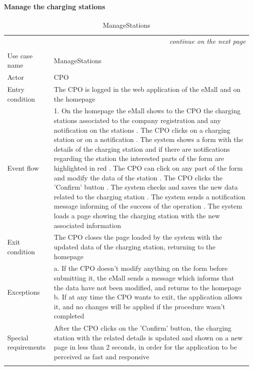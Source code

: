 \paragraph{Manage the charging stations}
\begin{center}
    \begin{longtable}{p{4cm} p{11cm}}
    \multicolumn{2}{r}{\itshape{continue on the next page}}\\
    \endfoot 
    \\
    \endlastfoot
    \hline
     Use case name &  ManageStations\\
     \hline
     Actor & CPO \\
     \hline
     Entry condition & The CPO is logged in the web application of the eMall and on the homepage \\
     \hline
     Event flow &   
        1. On the homepage the eMall shows to the CPO the charging stations associated to the company registration and any notification on the stations \newline
        2. The CPO clicks on a charging station or on a notification \newline 
        3. The system shows a form with the details of the charging station and if there are notifications regarding the station the interested parts of the form are highlighted in red \newline
        4. The CPO can click on any part of the form and modify the data of the station \newline
        5. The CPO clicks the 'Confirm' button \newline
        6. The system checks and saves the new data related to the charging station \newline
        7. The system sends a notification message informing of the success of the operation \newline
        8. The system loads a page showing the charging station with the new associated information\\
     \hline
     Exit condition &  The CPO closes the page loaded by the system with the updated data of the charging station, returning to the homepage \\
     \hline
     Exceptions &   a. If the CPO doesn't modify anything on the form before submitting it, the eMall sends a                       message which informs that the data have not been modified, and returns to the homepage \newline
                    b. If at any time the CPO wants to exit, the application allows it, and no changes will be applied if the procedure wasn't completed \\
     \hline
     Special requirements & After the CPO clicks on the 'Confirm' button, the charging station with the related details is updated and shown on a new page in less than 2 seconds, in order for the application to be perceived as fast and responsive \\
     \hline
    \caption{ManageStations}
    \label{tab:ManageStations}
    \end{longtable}
\end{center}

